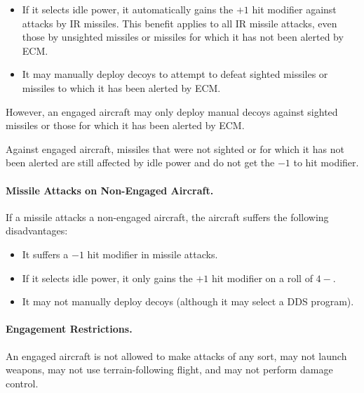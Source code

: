 {\begin{itemize}

    \item If it selects idle power, it automatically gains the $+1$ hit modifier against attacks by IR missiles. This benefit applies to all IR missile attacks, even those by unsighted missiles or missiles for which it has not been alerted by ECM.
    
    \item It may manually deploy decoys to attempt to defeat sighted missiles or missiles to which it has been alerted by ECM.
    
\end{itemize}

However, an engaged aircraft may only deploy manual decoys against sighted missiles or those for which it has been alerted by ECM. 

Against engaged aircraft, missiles that were not sighted or for which it has not been alerted are still affected by idle power and do not get the $-1$ to hit modifier.

\paragraph{Missile Attacks on Non-Engaged Aircraft.} If a missile attacks a non-engaged aircraft, the aircraft suffers the following disadvantages:

\begin{itemize}

    \item It suffers a $-1$ hit modifier in missile attacks.

    \item If it selects idle power, it only gains the $+1$ hit modifier on a roll of $4-$. 
    
    \item It may not manually deploy decoys (although it may select a DDS program).
    
\end{itemize}


\paragraph{Engagement Restrictions.} An engaged aircraft is not allowed to make attacks of any sort, may not launch weapons, may not use terrain-following flight, and may not perform damage control.

}

